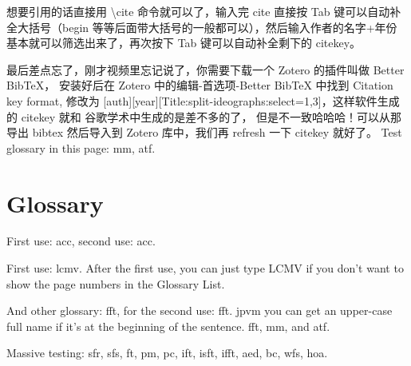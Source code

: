 想要引用的话直接用 \textbackslash cite 命令就可以了，输入完 cite 直接按 Tab
键可以自动补全大括号（begin 等等后面带大括号的一般都可以），然后输入作者的名字+年份
基本就可以筛选出来了，再次按下 Tab 键可以自动补全剩下的 citekey\cite{Malmkjaer2017TheRoutledgeHandbook,Officer1958Introductiontothe,TanXueLan2019DangDaiYi}。

最后差点忘了，刚才视频里忘记说了，你需要下载一个 Zotero 的插件叫做 Better BibTeX，
安装好后在 Zotero 中的编辑-首选项-Better BibTeX 中找到 Citation key format, 
修改为 [auth][year][Title:split-ideographs:select=1,3]，这样软件生成的 citekey 就和
谷歌学术中生成的是差不多的了\cite{WangBinHua2019KouYiLi,XuMing2016YiShiChang}，
但是不一致哈哈哈！可以从那导出 bibtex 然后导入到 Zotero 库中，我们再 refresh 一下 citekey 就好了。 Test glossary in this page: \gls{mm}, \gls{atf}.

\section{Glossary}
First use: \gls{acc}, second use: \gls{acc}.

First use: \gls{lcmv}. After the first use, you can just type LCMV if you don't want to show the page numbers in the Glossary List.

And other glossary: \gls{fft}, for the second use: \gls{fft}. \Gls{jpvm} you can get an upper-case full name if it's at the beginning of the sentence. \gls{fft}, \gls{mm}, and \gls{atf}.

Massive testing: \Gls{sfr}, \gls{sfs}, \gls{ft}, \gls{pm}, \gls{pc}, \gls{ift}, \gls{isft}, \gls{ifft}, \gls{aed}, \gls{bc}, \gls{wfs}, \gls{hoa}.

\clearpage %

